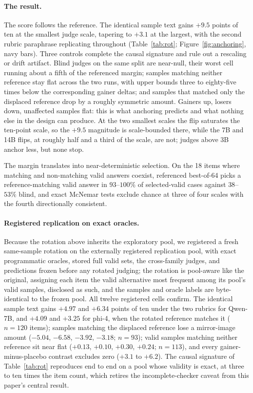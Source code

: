 \documentclass[11pt]{article}
\begin{document}
\paragraph{The result.}
The score follows the reference.
The identical sample text gains $+9.5$ points of ten at the smallest judge scale, tapering to $+3.1$ at the largest, with the second rubric paraphrase replicating throughout (Table~\ref{tab:rot}; Figure~\ref{fig:anchoring}, navy bars).
Three controls complete the causal signature and rule out a rescaling or drift artifact.
Blind judges on the same split are near-null, their worst cell running about a fifth of the referenced margin; samples matching neither reference stay flat across the two runs, with upper bounds three to eighty-five times below the corresponding gainer deltas; and samples that matched only the displaced reference drop by a roughly symmetric amount.
Gainers up, losers down, unaffected samples flat: this is what anchoring predicts and what nothing else in the design can produce.
At the two smallest scales the flip saturates the ten-point scale, so the $+9.5$ magnitude is scale-bounded there, while the 7B and 14B flips, at roughly half and a third of the scale, are not; judges above 3B anchor less, but none stop.

The margin translates into near-deterministic selection.
On the 18 items where matching and non-matching valid answers coexist, referenced best-of-64 picks a reference-matching valid answer in $93$--$100\%$ of selected-valid cases against $38$--$53\%$ blind, and exact McNemar tests exclude chance at three of four scales with the fourth directionally consistent.

\paragraph{Registered replication on exact oracles.}
Because the rotation above inherits the exploratory pool, we registered a fresh same-sample rotation on the externally registered replication pool, with exact programmatic oracles, stored full valid sets, the cross-family judges, and predictions frozen before any rotated judging; the rotation is pool-aware like the original, assigning each item the valid alternative most frequent among its pool's valid samples, disclosed as such, and the samples and oracle labels are byte-identical to the frozen pool.
All twelve registered cells confirm.
The identical sample text gains $+4.97$ and $+6.34$ points of ten under the two rubrics for Qwen-7B, and $+4.09$ and $+3.25$ for phi-4, when the rotated reference matches it ($n{=}120$ items); samples matching the displaced reference lose a mirror-image amount ($-5.04$, $-6.58$, $-3.92$, $-3.18$; $n{=}93$); valid samples matching neither reference sit near flat ($+0.13$, $+0.10$, $+0.30$, $+0.24$; $n{=}113$), and every gainer-minus-placebo contrast excludes zero ($+3.1$ to $+6.2$).
The causal signature of Table~\ref{tab:rot} reproduces end to end on a pool whose validity is exact, at three to ten times the item count, which retires the incomplete-checker caveat from this paper's central result.
\end{document}
